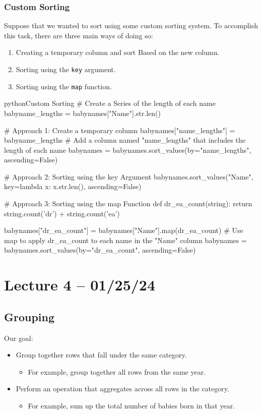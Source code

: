 \documentclass[openany]{book}
\begin{document}
\subsubsection{Custom Sorting}
Suppose that we wanted to sort using some custom sorting system. To accomplish this task, there are three main ways of doing so:
\begin{enumerate}
	\item Creating a temporary column and sort Based on the new column.
	\item Sorting using the \texttt{key} argument.
	\item Sorting using the \texttt{map} function.
\end{enumerate}
\begin{code}{python}{Custom Sorting}
# Create a Series of the length of each name
babyname_lengths = babynames["Name"].str.len()

# Approach 1: Create a temporary column
babynames["name_lengths"] = babyname_lengths # Add a column named "name_lengths" that includes the length of each name
babynames = babynames.sort_values(by="name_lengths", ascending=False)

# Approach 2: Sorting using the key Argument
babynames.sort_values("Name", key=lambda x: x.str.len(), ascending=False)

# Approach 3: Sorting using the map Function
def dr_ea_count(string):
  return string.count('dr') + string.count('ea')

babynames["dr_ea_count"] = babynames["Name"].map(dr_ea_count) # Use map to apply dr_ea_count to each name in the "Name" column
babynames = babynames.sort_values(by="dr_ea_count", ascending=False)
\end{code}

\section{Lecture 4 -- 01/25/24}
\subsection{Grouping}
Our goal:
\begin{itemize}
	\item Group together rows that fall under the same category. 
	\begin{itemize}
		\item For example, group together all rows from the same year.
	\end{itemize}
	\item Perform an operation that aggregates across all rows in the category. 
	\begin{itemize}
		\item For example, sum up the total number of babies born in that year.
	\end{itemize}
\end{itemize}
\end{document}
